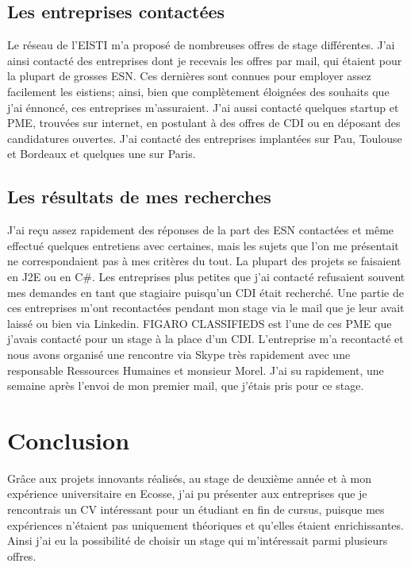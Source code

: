 \subsection{Les entreprises contactées}
Le réseau de l'EISTI m'a proposé de nombreuses offres de stage différentes.
J'ai ainsi contacté des entreprises dont je recevais les offres par mail, qui étaient pour la plupart de grosses ESN.
Ces dernières sont connues pour employer assez facilement les eistiens; ainsi, bien que complètement éloignées des souhaits que j'ai énnoncé, ces entreprises m'assuraient.
J'ai aussi contacté quelques startup et PME, trouvées sur internet, en postulant à des offres de CDI ou en déposant des candidatures ouvertes.
J'ai contacté des entreprises implantées sur Pau, Toulouse et Bordeaux et quelques une sur Paris.

\subsection{Les résultats de mes recherches}
J'ai reçu assez rapidement des réponses de la part des ESN contactées et même effectué quelques entretiens avec certaines, mais les sujets que l'on me présentait ne correspondaient pas à mes critères du tout.
La plupart des projets se faisaient en J2E ou en C\#.
Les entreprises plus petites que j'ai contacté refusaient souvent mes demandes en tant que stagiaire puisqu'un CDI était recherché.
Une partie de ces entreprises m'ont recontactées pendant mon stage via le mail que je leur avait laissé ou bien via Linkedin.
FIGARO CLASSIFIEDS est l'une de ces PME que j'avais contacté pour un stage à la place d'un CDI.
L'entreprise m'a recontacté et nous avons organisé une rencontre via Skype très rapidement avec une responsable Ressources Humaines et monsieur Morel.
J'ai su rapidement, une semaine après l'envoi de mon premier mail, que j'étais pris pour ce stage.


\section{Conclusion}

Grâce aux projets innovants réalisés, au stage de deuxième année et à mon expérience universitaire en Ecosse, j'ai pu présenter aux entreprises que je rencontrais un CV intéressant pour un étudiant en fin de cursus, puisque mes expériences n'étaient pas uniquement théoriques et qu'elles étaient enrichissantes.
Ainsi j'ai eu la possibilité de choisir un stage qui m'intéressait parmi plusieurs offres.
